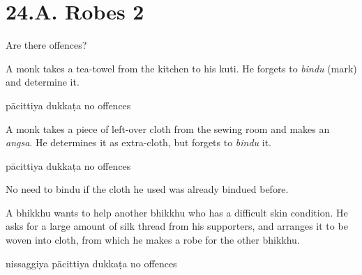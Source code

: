 \chapter{24.A. Robes 2}
\renewcommand*{\theChapterTitle}{24.A. Robes 2}

\begin{exam}{\autoExamName}

  \begin{problem*}

    Are there offences?

    \begin{parts}

      \item A monk takes a tea-towel from the kitchen to his kuti.
      He forgets to \emph{bindu} (mark) and determine it.

      \bigskip

      \begin{answers}{3}
        \bChoices
         pācittiya\eAns
         dukkaṭa\eAns
         no offences\eAns
        \eChoices
      \end{answers}

      \bigskip

      \item A monk takes a piece of left-over cloth from the sewing room and
      makes an \emph{angsa}. He determines it as extra-cloth, but forgets to \emph{bindu} it.

      \bigskip

      \begin{answers}{3}
        \bChoices
         pācittiya\eAns
         dukkaṭa\eAns
         no offences\eAns
        \eChoices
      \end{answers}

      \begin{solution}
        No need to bindu if the cloth he used was already bindued before.
      \end{solution}

      \bigskip

      \item A bhikkhu wants to help another bhikkhu who has a difficult skin
      condition. He asks for a large amount of silk thread from his supporters,
      and arranges it to be woven into cloth, from which he makes a robe for the
      other bhikkhu.

      \bigskip

      \begin{answers}{3}
        \bChoices
         nissaggiya pācittiya\eAns
         dukkaṭa\eAns
         no offences\eAns
        \eChoices
      \end{answers}


\end{parts}
\end{problem*}
\end{exam}
